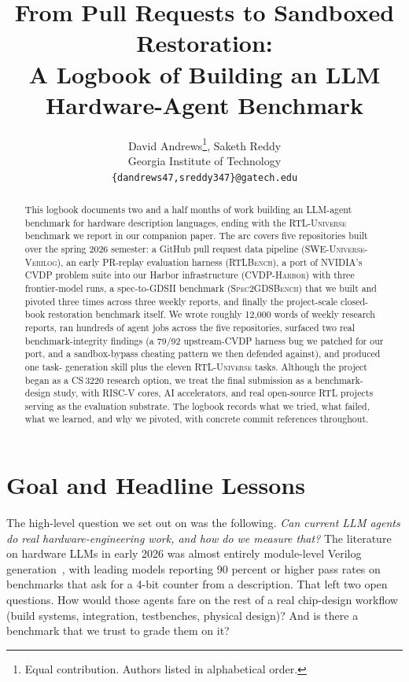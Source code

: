 \documentclass{article}
\title{From Pull Requests to Sandboxed Restoration:\\
       A Logbook of Building an LLM Hardware-Agent Benchmark}
\author{
  David Andrews\thanks{Equal contribution. Authors listed in alphabetical order.},
  Saketh Reddy\footnotemark[1] \\
  Georgia Institute of Technology \\
  \texttt{\{dandrews47,sreddy347\}@gatech.edu}
}
\begin{document}
\maketitle

\begin{abstract}
This logbook documents two and a half months of work building an LLM-agent benchmark for
hardware description languages, ending with the \textsc{RTL-Universe} benchmark we report
in our companion paper. The arc covers five repositories built over the spring 2026
semester: a GitHub pull request data pipeline (\textsc{SWE-Universe-Verilog}), an early
PR-replay evaluation harness (\textsc{RTLBench}), a port of NVIDIA's CVDP problem suite
into our Harbor infrastructure (\textsc{CVDP-Harbor}) with three frontier-model runs, a
spec-to-GDSII benchmark (\textsc{Spec2GDSBench}) that we built and pivoted three times
across three weekly reports, and finally the project-scale closed-book restoration
benchmark itself. We wrote roughly 12{,}000 words of weekly research reports, ran
hundreds of agent jobs across the five repositories, surfaced two real
benchmark-integrity findings (a 79/92 upstream-CVDP harness bug we patched for our port,
and a sandbox-bypass cheating pattern we then defended against), and produced one task-
generation skill plus the eleven \textsc{RTL-Universe} tasks. Although the project began
as a CS\,3220 research option, we treat the final submission as a benchmark-design study,
with RISC-V cores, AI accelerators, and real open-source RTL projects serving as the
evaluation substrate. The logbook records what we tried, what failed, what we learned,
and why we pivoted, with concrete commit references throughout.
\end{abstract}

\section{Goal and Headline Lessons}

The high-level question we set out on was the following. \emph{Can current LLM agents do
real hardware-engineering work, and how do we measure that?} The literature on hardware
LLMs in early 2026 was almost entirely module-level Verilog
generation~\citep{verilogeval, rtllm, verigen, rtlcoder, openllmrtl, betterv}, with leading
models reporting 90 percent or higher pass rates on benchmarks that ask for a 4-bit
counter from a description. That left two open questions. How would those agents fare on
the rest of a real chip-design workflow (build systems, integration, testbenches, physical
design)? And is there a benchmark that we trust to grade them on it?
\end{document}
